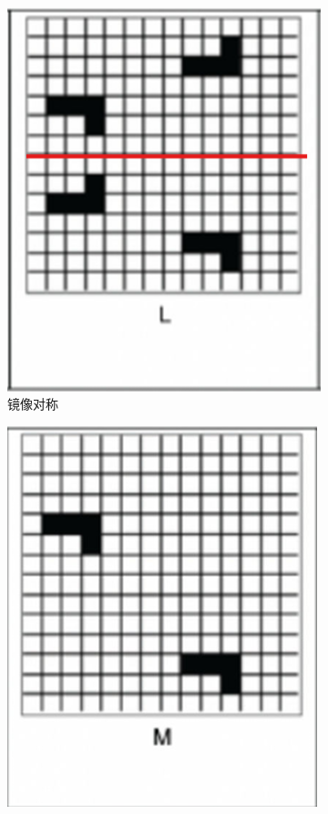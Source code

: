 \documentclass{customDoc}
\begin{document}
\begin{figure}[H]
\begin{subfigure}[b]{0.2\textwidth}
        \includegraphics[width=\textwidth]{L.png}
        \caption{镜像对称}
        \label{fig:symmetry_B}
    \end{subfigure}
    \hfill
    \begin{subfigure}[b]{0.2\textwidth}
        \includegraphics[width=\textwidth]{M.png}

\end{subfigure}
\end{figure}
\end{document}
